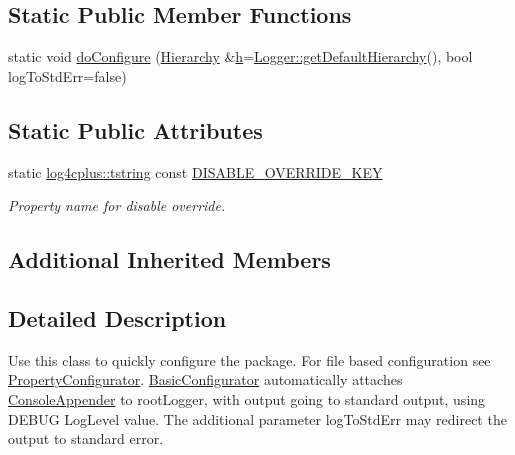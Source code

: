 \subsection*{Static Public Member Functions}
\begin{DoxyCompactItemize}
\item 
static void \hyperlink{classlog4cplus_1_1BasicConfigurator_a9cf4b7a2e95ccbfa3eb3dcb5c6e479df}{do\-Configure} (\hyperlink{classlog4cplus_1_1Hierarchy}{Hierarchy} \&\hyperlink{classlog4cplus_1_1PropertyConfigurator_ae80f772be9d4eb67922d34f4e2dd71d1}{h}=\hyperlink{classlog4cplus_1_1Logger_a8d258d78a9a86f1f3a3241f43d015287}{Logger\-::get\-Default\-Hierarchy}(), bool log\-To\-Std\-Err=false)
\end{DoxyCompactItemize}
\subsection*{Static Public Attributes}
\begin{DoxyCompactItemize}
\item 
static \hyperlink{namespacelog4cplus_a3c9287f6ebcddc50355e29d71152117b}{log4cplus\-::tstring} const \hyperlink{classlog4cplus_1_1BasicConfigurator_ab49c9a199cf259ac23ac9684da03176c}{D\-I\-S\-A\-B\-L\-E\-\_\-\-O\-V\-E\-R\-R\-I\-D\-E\-\_\-\-K\-E\-Y}
\begin{DoxyCompactList}\small\item\em Property name for disable override. \end{DoxyCompactList}\end{DoxyCompactItemize}
\subsection*{Additional Inherited Members}


\subsection{Detailed Description}
Use this class to quickly configure the package. For file based configuration see \hyperlink{classlog4cplus_1_1PropertyConfigurator}{Property\-Configurator}. \hyperlink{classlog4cplus_1_1BasicConfigurator}{Basic\-Configurator} automatically attaches \hyperlink{classlog4cplus_1_1ConsoleAppender}{Console\-Appender} to {\ttfamily root\-Logger}, with output going to standard output, using D\-E\-B\-U\-G Log\-Level value. The additional parameter log\-To\-Std\-Err may redirect the output to standard error. 


